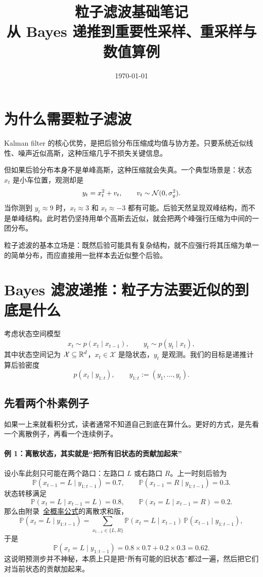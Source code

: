 \documentclass[12pt,a4paper]{ctexart}
\title{粒子滤波基础笔记\\
\large 从 Bayes 递推到重要性采样、重采样与数值算例}
\author{}
\date{\today}
\begin{document}
\maketitle
\tableofcontents

\section{为什么需要粒子滤波}

Kalman filter 的核心优势，是把后验分布压缩成均值与协方差。只要系统近似线性、噪声近似高斯，这种压缩几乎不损失关键信息。

但如果后验分布本身不是单峰高斯，这种压缩就会失真。一个典型场景是：状态 \(x_t\) 是小车位置，观测却是
\[
y_t = x_t^2 + v_t,
\qquad
v_t \sim \mathcal{N}(0,\sigma_y^2).
\]
当你测到 \(y_t \approx 9\) 时，\(x_t \approx 3\) 和 \(x_t \approx -3\) 都有可能。后验天然呈现双峰结构，而不是单峰结构。此时若仍坚持用单个高斯去近似，就会把两个峰强行压缩为中间的一团分布。

粒子滤波的基本立场是：既然后验可能具有复杂结构，就不应强行将其压缩为单一的简单分布，而应直接用一批样本去近似整个后验。

\section{Bayes 滤波递推：粒子方法要近似的到底是什么}

考虑状态空间模型
\[
x_t \sim p(x_t \mid x_{t-1}), \qquad
y_t \sim p(y_t \mid x_t),
\]
其中状态空间记为 \(\mathcal X \subseteq \mathbb{R}^d\)，\(x_t \in \mathcal X\) 是隐状态，\(y_t\) 是观测。我们的目标是递推计算后验密度
\[
p(x_t \mid y_{1:t}),
\qquad
y_{1:t} := (y_1,\dots,y_t).
\]

\subsection{先看两个朴素例子}

如果一上来就看积分式，读者通常不知道自己到底在算什么。更好的方式，是先看一个离散例子，再看一个连续例子。

\paragraph{例 1：离散状态，其实就是“把所有旧状态的贡献加起来”}
设小车此刻只可能在两个路口：左路口 \(L\) 或右路口 \(R\)。上一时刻后验为
\[
\mathbb{P}(x_{t-1}=L \mid y_{1:t-1}) = 0.7,
\qquad
\mathbb{P}(x_{t-1}=R \mid y_{1:t-1}) = 0.3.
\]
状态转移满足
\[
\mathbb{P}(x_t=L \mid x_{t-1}=L)=0.8,
\qquad
\mathbb{P}(x_t=L \mid x_{t-1}=R)=0.2.
\]
那么由附录~\hyperref[app:total-prob]{全概率公式}的离散求和版，
\[
\mathbb{P}(x_t=L \mid y_{1:t-1})
= \sum_{x_{t-1}\in\{L,R\}}
\mathbb{P}(x_t=L \mid x_{t-1})\,
\mathbb{P}(x_{t-1} \mid y_{1:t-1}),
\]
于是
\[
\mathbb{P}(x_t=L \mid y_{1:t-1})
= 0.8\times 0.7 + 0.2\times 0.3
= 0.62.
\]
这说明预测步并不神秘，本质上只是把“所有可能的旧状态”都过一遍，然后把它们对当前状态的贡献加起来。
\end{document}
